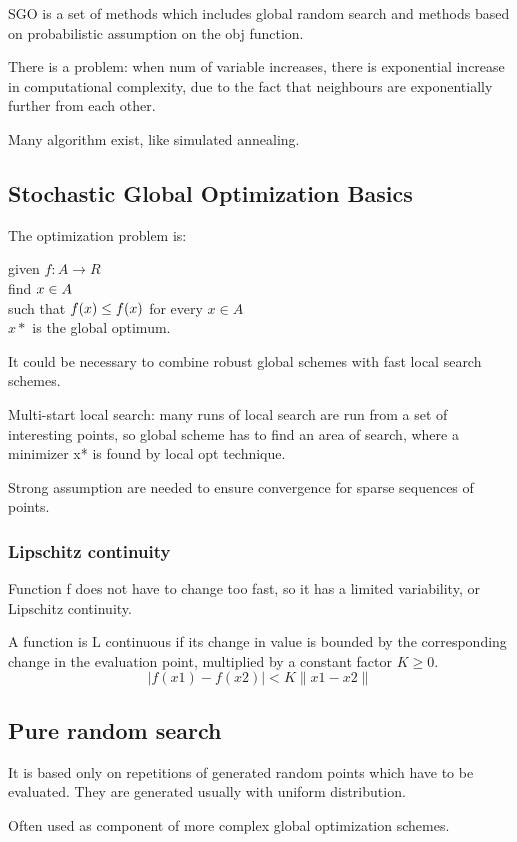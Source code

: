 \documentclass[11pt]{article}
\begin{document}
SGO is a set of methods which includes global random search and methods based on probabilistic assumption on the obj function. 

There is a problem: when num of variable increases, there is exponential increase in computational complexity, due to the fact that neighbours are exponentially further from each other.
 
Many algorithm exist, like simulated annealing.

\subsection{Stochastic Global Optimization Basics}
The optimization problem is:

given $ f : A \rightarrow R $ \\
find $ x\* \in A $ \\
such that $ f(x\*) \leq f(x) $ for every $ x \in A $ \\

$ x\ast $ is the global optimum.

It could be necessary to combine robust global schemes with fast local search schemes.

Multi-start local search: many runs of local search are run from a set of interesting points, so global scheme has to find an area of search, where a minimizer x* is found by local opt technique.

Strong assumption are needed to ensure convergence for sparse sequences of points. 

\subsubsection{Lipschitz continuity}
Function f does not have to change too fast, so it has a limited variability, or Lipschitz continuity. 

A function is L continuous if its change in value is bounded by the corresponding change in the evaluation point, multiplied by a constant factor $ K \geq 0 $.
$$
\mid f(x1)-f(x2) \mid < K \parallel x1 - x2 \parallel
$$ 

\subsection{Pure random search}
It is based only on repetitions of generated random points which have to be evaluated. They are generated usually with uniform distribution. 

Often used as component of more complex global optimization schemes. 
\end{document}
